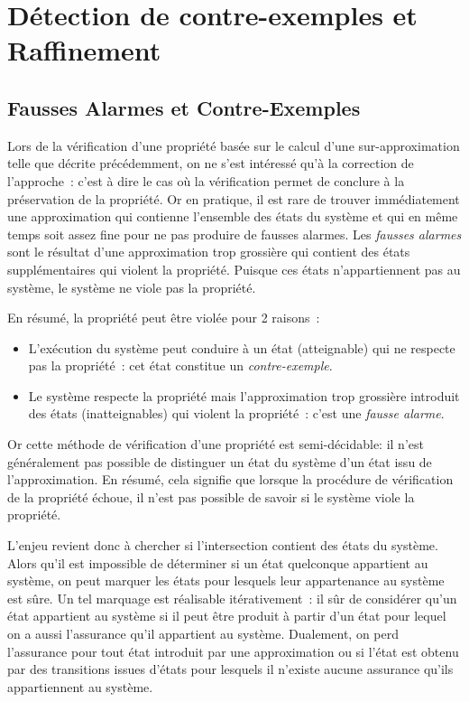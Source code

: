 \chapter{Détection de contre-exemples et Raffinement}
\section{Fausses Alarmes et Contre-Exemples}
Lors de la vérification d'une propriété basée sur le calcul d'une sur-approximation telle
que décrite précédemment, on ne s'est intéressé qu'à la correction de l'approche~: c'est à dire le
cas où la vérification permet de conclure à la préservation de la propriété. Or en pratique, il est rare
de trouver immédiatement une approximation qui contienne l'ensemble des états du système et qui en
même temps soit assez fine pour ne pas produire de fausses alarmes. Les \emph{fausses alarmes} sont
le résultat d'une approximation trop grossière qui contient des états supplémentaires qui violent la
propriété. Puisque ces états n'appartiennent pas au système, le système ne viole pas la propriété.



En résumé, la propriété peut être violée pour 2 raisons~:\\

\begin{itemize}
\item L'exécution du système peut conduire à un état (atteignable) qui ne
  respecte pas la propriété~: cet état constitue un \emph{contre-exemple}.
  
\item Le système respecte la propriété mais l'approximation trop
  grossière introduit des états (inatteignables) qui violent la
  propriété~: c'est une \emph{fausse alarme}.\\
\end{itemize}

Or cette méthode de vérification d'une propriété est semi-décidable: il n'est généralement pas possible
de distinguer un état du système d'un état issu de l'approximation. En résumé, cela signifie que lorsque
la procédure de vérification de la propriété échoue, il n'est pas possible de savoir si le système viole
la propriété.

L'enjeu revient donc à chercher si l'intersection contient des états du système. Alors qu'il est impossible
de déterminer si un état quelconque appartient au système, on peut marquer les états pour lesquels leur
appartenance au système est sûre. Un tel marquage est réalisable itérativement~: il sûr de considérer qu'un état
appartient au système si il peut être produit à partir d'un état pour lequel on a aussi l'assurance qu'il
appartient au système. Dualement, on perd l'assurance pour tout état introduit par une approximation ou
si l'état est obtenu par des transitions issues d'états pour lesquels il n'existe aucune assurance
qu'ils appartiennent au système.


